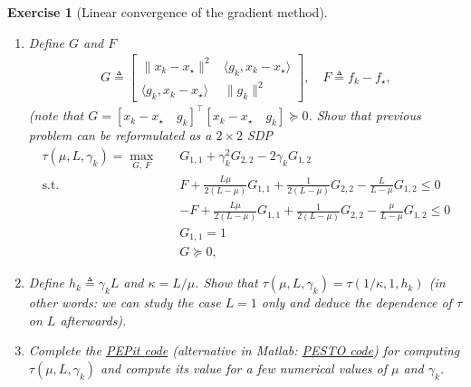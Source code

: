 \documentclass[11pt,a4paper]{article}
\newcommand{\normsq}[1]{{\left\lVert#1\right\rVert}^2}
\newcommand{\inner}[2]{{\langle #1, #2\rangle}}
\newcommand{\pesto}{{PESTO }}
\newcommand{\pepit}{{PEPit }}
\newtheorem{exercise}{Exercise}
\begin{document}
\begin{exercise}[Linear convergence of the gradient method]
\begin{enumerate}
\begin{equation*}
\begin{aligned}
		\text{s.t. } & f_\star\geqslant f_k+\inner{g_k}{x_\star-x_k}+\tfrac{1}{2L}\normsq{g_\star-g_k}+\tfrac{\mu}{2(1-\mu/L)}\normsq{x_\star-x_k-\tfrac{1}{L}(g_\star-g_k)}\\
			&f_k\geqslant f_\star+\inner{g_\star}{x_k-x_\star}+\tfrac{1}{2L}\normsq{g_k-g_\star}+\tfrac{\mu}{2(1-\mu/L)}\normsq{x_k-x_\star-\tfrac{1}{L}(g_k-g_\star)}\\
		& \|x_k-x_\star\|^2 = 1\\
		& x_{k+1}=x_k-\gamma  g_k\\
		& g_\star=0.\\
		\end{aligned}
		\end{equation*}
	\item Define $G$ and $F$
			\begin{align*}
			G \triangleq \begin{bmatrix}
			\|x_k-x_\star\|^2 & \langle g_k,x_k-x_\star\rangle\\
			\langle g_k, x_k-x_\star\rangle & \| g_k\|^2
			\end{bmatrix},\quad 	F \triangleq 			f_k-f_\star,
			\end{align*}
			(note that $G=[x_k-x_\star \quad g_k]^\top [x_k-x_\star \quad g_k]\succcurlyeq 0$. Show that previous problem can be reformulated as a $2\times 2$ SDP  
			\begin{equation*}
			\begin{aligned}
			\tau(\mu,L,\gamma_k)=\max_{G,\, F} \quad & G_{1,1}+\gamma_k ^2 G_{2,2}-2\gamma_k G_{1,2}\\
			\text{s.t. } \quad & F + \tfrac{L\mu}{2(L-\mu)} G_{1,1}+\tfrac{1}{2(L-\mu)}G_{2,2}-\tfrac{L}{L-\mu}G_{1,2}\leqslant 0\\
			&-F + \tfrac{L\mu}{2(L-\mu)} G_{1,1}+\tfrac{1}{2(L-\mu)}G_{2,2}-\tfrac{\mu}{L-\mu}G_{1,2}\leqslant 0\\
			&G_{1,1}= 1\\
			&G\succcurlyeq 0,
			\end{aligned}
			\end{equation*}
	\item Define $h_k\triangleq \gamma_k L$ and $\kappa=L/\mu$. Show that $\tau(\mu,L,\gamma_k)=\tau(1/\kappa,1,h_k)$ (in other words: we can study the case $L=1$ only and deduce the dependence of $\tau$ on $L$ afterwards).
	\item Complete the \href{aa}{\pepit code} (alternative in Matlab: \href{aa}{\pesto code}) for computing $\tau(\mu,L,\gamma_k)$ and compute its value for a few numerical values of $\mu$ and $\gamma_k$. 

\end{enumerate}
\end{exercise}
\end{document}
